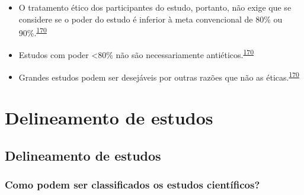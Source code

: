 \documentclass[
  a4paper,
]{book}
\begin{document}
\begin{itemize}
\item
  O tratamento ético dos participantes do estudo, portanto, não exige que se considere se o poder do estudo é inferior à meta convencional de 80\% ou 90\%.\textsuperscript{\protect\hyperlink{ref-Bacchetti2005}{170}}
\item
  Estudos com poder \textless80\% não são necessariamente antiéticos.\textsuperscript{\protect\hyperlink{ref-Bacchetti2005}{170}}
\item
  Grandes estudos podem ser desejáveis por outras razões que não as éticas.\textsuperscript{\protect\hyperlink{ref-Bacchetti2005}{170}}
\end{itemize}

\hypertarget{delineamento-estudos}{%
\chapter{\texorpdfstring{\textbf{Delineamento de estudos}}{Delineamento de estudos}}\label{delineamento-estudos}}

\hypertarget{delineamento-estudos}{%
\section{Delineamento de estudos}\label{delineamento-estudos}}

\hypertarget{como-podem-ser-classificados-os-estudos-cientuxedficos}{%
\subsection{Como podem ser classificados os estudos científicos?}\label{como-podem-ser-classificados-os-estudos-cientuxedficos}}
\end{document}
